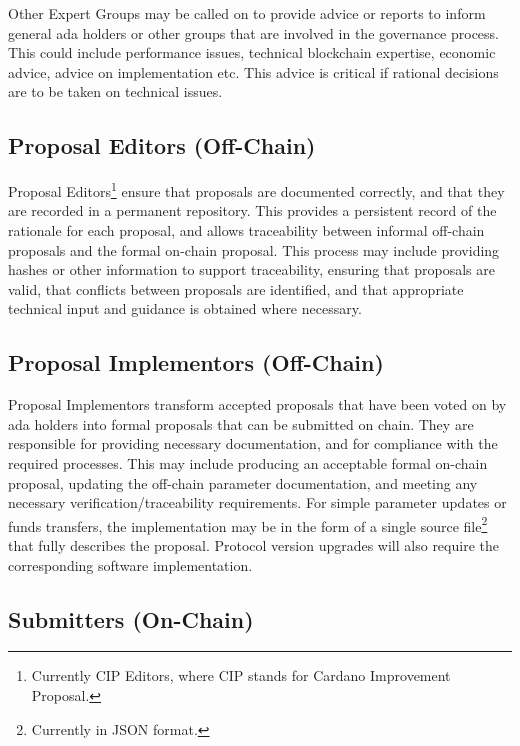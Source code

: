 Other Expert Groups may be called on to provide advice or reports to inform general ada holders or other groups that are involved in the
governance process.  This could include performance issues, technical blockchain expertise, economic advice, advice on implementation etc.
This advice is critical if rational decisions are to be taken on technical issues.

\subsection{Proposal Editors (Off-Chain)}

Proposal Editors\footnote{Currently CIP Editors, where CIP stands for Cardano Improvement Proposal.} ensure that proposals are documented correctly, and that they are recorded in a
permanent repository.
This provides a persistent record of the rationale for each proposal, and allows traceability between informal off-chain
proposals and the formal on-chain proposal.  This process may include providing hashes or other information to support traceability,
ensuring that proposals are valid, that conflicts between proposals are identified, and that appropriate technical input and
guidance is obtained where necessary.

\subsection{Proposal Implementors (Off-Chain)}

Proposal Implementors transform accepted proposals that have been voted on by ada holders into formal proposals that can be submitted on chain.
They are responsible for providing necessary documentation, and for compliance with the required processes.  This may include producing an acceptable formal on-chain proposal,
updating the off-chain parameter documentation,
and meeting any necessary verification/traceability requirements.  For simple parameter updates or funds transfers, the implementation may be in the form of a single
source file\footnote{Currently in JSON format.} that fully describes the proposal. Protocol version upgrades will also require the corresponding software implementation.

\subsection{Submitters (On-Chain)}

